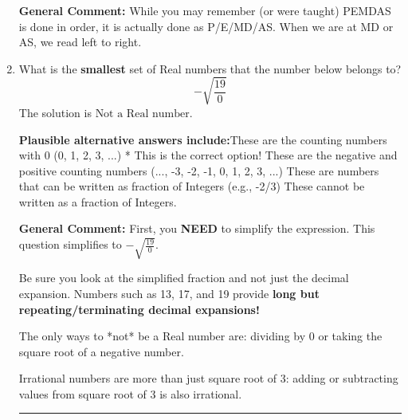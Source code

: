 \documentclass{extbook}[14pt]
\newcommand{\litem}[1]{\item #1

\rule{\textwidth}{0.4pt}}
\begin{document}
\begin{enumerate}
{\textbf{General Comment:} While you may remember (or were taught) PEMDAS is done in order, it is actually done as P/E/MD/AS. When we are at MD or AS, we read left to right.
}
\litem{
What is the \textbf{smallest} set of Real numbers that the number below belongs to?
\[ -\sqrt{\frac{19}{0}} \]The solution is \( \text{Not a Real number} \).\begin{enumerate}[label=\Alph*.]
\textbf{Plausible alternative answers include:}These are the counting numbers with 0 (0, 1, 2, 3, ...)
* This is the correct option!
These are the negative and positive counting numbers (..., -3, -2, -1, 0, 1, 2, 3, ...)
These are numbers that can be written as fraction of Integers (e.g., -2/3)
These cannot be written as a fraction of Integers.
\end{enumerate}

\textbf{General Comment:} First, you \textbf{NEED} to simplify the expression. This question simplifies to $-\sqrt{\frac{19}{0}}$. 
 
 Be sure you look at the simplified fraction and not just the decimal expansion. Numbers such as 13, 17, and 19 provide \textbf{long but repeating/terminating decimal expansions!} 
 
 The only ways to *not* be a Real number are: dividing by 0 or taking the square root of a negative number. 
 
 Irrational numbers are more than just square root of 3: adding or subtracting values from square root of 3 is also irrational.
}
\end{enumerate}
\end{document}
